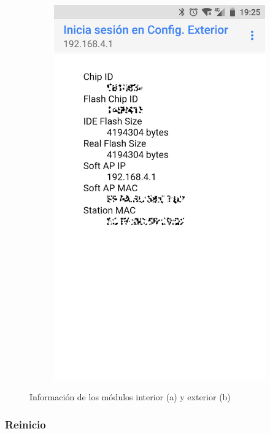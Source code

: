 \begin{figure}[b!]
\begin{subfigure}{0.49\columnwidth}
  \includegraphics[width=1\columnwidth,frame]{images/exterior-info}
  \caption{}
  \label{fig:exterior-info}
\end{subfigure}
\caption{Información de los módulos interior (a) y exterior (b)}
\label{fig:info}
\end{figure}

\clearpage

\subsubsection{Reinicio}
\label{sec:reinicio}

